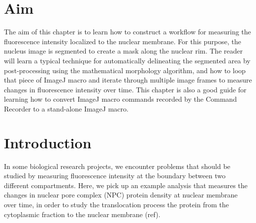 \setcounter{chapter}{0}


\section{Aim}

The aim of this chapter is to learn how to construct a workflow for measuring the fluorescence intensity localized to the nuclear membrane. For this purpose, the nucleus image is segmented to create a mask along the nuclear rim. The reader will learn a typical technique for automatically delineating the segmented area by post-processing using the mathematical morphology algorithm, and how to loop that piece of ImageJ macro and iterate through multiple image frames to measure changes in fluorescence intensity over time. This chapter is also a good guide for learning how to convert ImageJ macro commands recorded by the Command Recorder to a stand-alone ImageJ macro.  

\section{Introduction}


In some biological research projects, we encounter problems that should be studied by measuring fluorescence intensity at the boundary between two different compartments. Here, we pick up an example analysis that measures the changes in nuclear pore complex (NPC) protein density at nuclear membrane over time, in order to study the translocation process the protein from the cytoplasmic fraction to the nuclear membrane (ref). 

